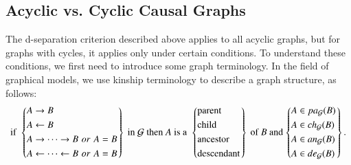 \documentclass[twoside, 11pt]{article}
\begin{document}
\subsection{Acyclic vs. Cyclic Causal Graphs} \label{acyclicvscyclic}

The d-separation criterion described above applies to all acyclic graphs, but for graphs with cycles, it applies only under certain conditions.
To understand these conditions, we first need to introduce some graph terminology. In the field of graphical models, we use kinship terminology to describe a graph structure, as follows:
\begin{equation*}
\text{if }
  \begin{rcases}
    \begin{dcases}
      A \rightarrow B \\
      A \leftarrow B \\
      A \rightarrow \cdots \rightarrow B \,\,or \,\,A = B \\
      A \leftarrow \cdots \leftarrow B \,\,or \,\,A = B
\end{dcases}
  \end{rcases}
  \text{ in } \mathcal{G} \text{ then } A \text{ is a }
  \begin{rcases}
    \begin{dcases}
      \text{parent} \\
      \text{child} \\
      \text{ancestor} \\
      \text{descendant}
\end{dcases}
  \end{rcases}
\text{ of } B \text{ and}
  \begin{rcases}
    \begin{dcases}
      A \in pa_{\mathcal{G}}(B) \\
      A \in ch_{\mathcal{G}}(B) \\
      A \in an_{\mathcal{G}}(B) \\
      A \in de_{\mathcal{G}}(B)
\end{dcases}
  \end{rcases}
\text{.}
\end{equation*}
\end{document}

